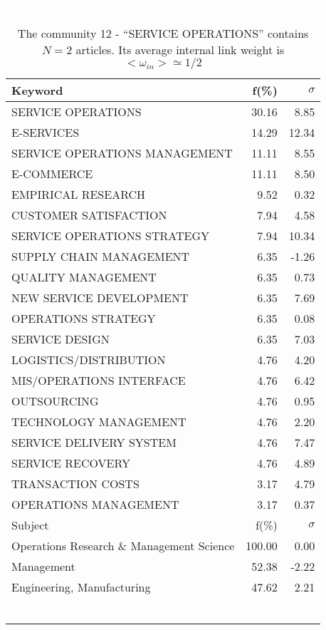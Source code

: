 \documentclass[a4paper,11pt]{report}
\begin{document}
\begin{landscape}
\clearpage

\begin{table}[!ht]
\caption{The community 12 - ``SERVICE OPERATIONS'' contains $N = 2$ articles. Its average internal link weight is $<\omega_{in}> \simeq 1/2$ }
\textcolor{white}{aa}\\
{\scriptsize\begin{tabular}{|l r r|}
\hline
Keyword & f(\%) & $\sigma$\\
\hline
SERVICE OPERATIONS & 30.16 & 8.85\\
E-SERVICES & 14.29 & 12.34\\
SERVICE OPERATIONS MANAGEMENT & 11.11 & 8.55\\
E-COMMERCE & 11.11 & 8.50\\
EMPIRICAL RESEARCH & 9.52 & 0.32\\
CUSTOMER SATISFACTION & 7.94 & 4.58\\
SERVICE OPERATIONS STRATEGY & 7.94 & 10.34\\
SUPPLY CHAIN MANAGEMENT & 6.35 & -1.26\\
QUALITY MANAGEMENT & 6.35 & 0.73\\
NEW SERVICE DEVELOPMENT & 6.35 & 7.69\\
OPERATIONS STRATEGY & 6.35 & 0.08\\
SERVICE DESIGN & 6.35 & 7.03\\
LOGISTICS/DISTRIBUTION & 4.76 & 4.20\\
MIS/OPERATIONS INTERFACE & 4.76 & 6.42\\
OUTSOURCING & 4.76 & 0.95\\
TECHNOLOGY MANAGEMENT & 4.76 & 2.20\\
SERVICE DELIVERY SYSTEM & 4.76 & 7.47\\
SERVICE RECOVERY & 4.76 & 4.89\\
TRANSACTION COSTS & 3.17 & 4.79\\
OPERATIONS MANAGEMENT & 3.17 & 0.37\\
\hline
\hline
Subject & f(\%) & $\sigma$\\
\hline
Operations Research \& Management Science & 100.00 & 0.00\\
Management & 52.38 & -2.22\\
Engineering, Manufacturing & 47.62 & 2.21\\
 &  & \\
 &  & \\
 &  & \\
 &  & \\
 &  & \\
 &  & \\

\end{tabular}}
\end{table}
\end{landscape}
\end{document}
